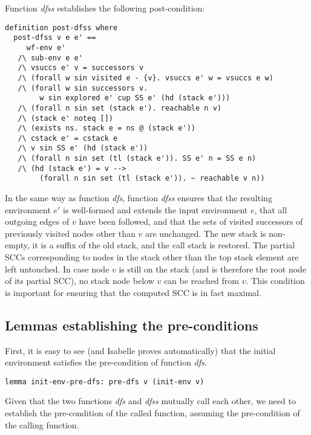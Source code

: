 \documentclass[sigplan,10pt,anonymous,review]{acmart}
\newcommand{\prog}[1]{\textit{#1}}
\begin{document}
Function \prog{dfss} establishes the following post-condition:

\begin{small}
\begin{lstlisting}[language=isabelle]
definition post-dfss where 
  post-dfss v e e' == 
     wf-env e'
   /\ sub-env e e'
   /\ vsuccs e' v = successors v
   /\ (forall w sin visited e - {v}. vsuccs e' w = vsuccs e w)
   /\ (forall w sin successors v.
        w sin explored e' cup SS e' (hd (stack e')))
   /\ (forall n sin set (stack e'). reachable n v)
   /\ (stack e' noteq [])
   /\ (exists ns. stack e = ns @ (stack e'))
   /\ cstack e' = cstack e
   /\ v sin SS e' (hd (stack e'))
   /\ (forall n sin set (tl (stack e')). SS e' n = SS e n)
   /\ (hd (stack e') = v -->
        (forall n sin set (tl (stack e')). ~ reachable v n))
\end{lstlisting}
\end{small}

In the same way as function \prog{dfs}, function \prog{dfss} ensures that the resulting environment $e'$ is well-formed and extends the input environment $e$, that all outgoing edges of $v$ have been followed, and that the sets of visited successors of previously visited nodes other than $v$ are unchanged. The new stack is non-empty, it is a suffix of the old stack, and the call stack is restored. The partial SCCs corresponding to nodes in the stack other than the top stack element are left untouched. In case node $v$ is still on the stack (and is therefore the root node of its partial SCC), no stack node below $v$ can be reached from $v$. This condition is important for ensuring that the computed SCC is in fact maximal.


\subsection{Lemmas establishing the pre-conditions}
\label{sec:pre-pre}

First, it is easy to see (and Isabelle proves automatically) that the initial environment satisfies the pre-condition of function \prog{dfs}.

\begin{small}
\begin{lstlisting}[language=isabelle]
lemma init-env-pre-dfs: pre-dfs v (init-env v)
\end{lstlisting}
\end{small}

Given that the two functions \prog{dfs} and \prog{dfss} mutually call each other, we need to establish the pre-condition of the called function, assuming the pre-condition of the calling function.
\end{document}
